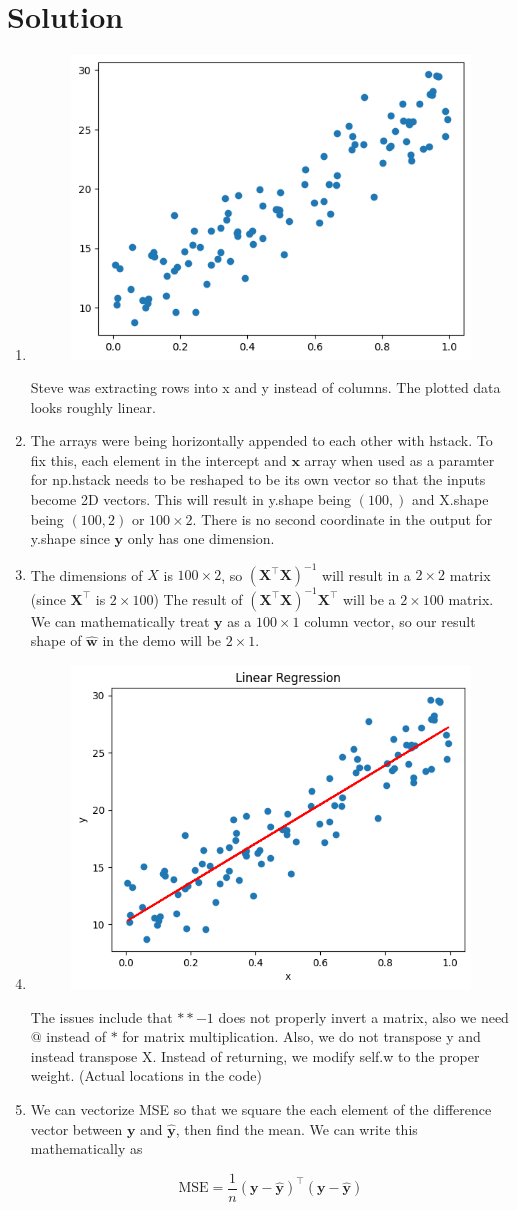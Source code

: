 \documentclass{../harvardml}
\theoremstyle{definition}
\theoremstyle{plain}
\newenvironment{solution}
  {\color{blue}\section*{Solution}}
{}
\begin{document}
\begin{solution}
	
    \begin{enumerate}
        \item 
        \begin{figure}[H]
            \centering
            \includegraphics[width=0.25\linewidth]{5a.png}
        \end{figure}
        Steve was extracting rows into x and y instead of columns. The plotted data looks roughly linear.
        \item The arrays were being horizontally appended to each other with hstack. To fix this, each element in the intercept and $\bm x$ array when used as a paramter for np.hstack needs to be reshaped to be its own vector so that the inputs become 2D vectors. This will result in y.shape being $(100, )$ and X.shape being $(100, 2)$ or $100 \times 2$. There is no second coordinate in the output for y.shape since $\bm y$ only has one dimension.
        \item The dimensions of $X$ is $100\times 2$, so $(\bm X^\top \bm X)^{-1}$ will result in a $2\times 2$ matrix (since $\bm X^\top$ is $2 \times 100$) The result of $(\bm X^\top \bm X)^{-1}\bm X^\top$ will be a $2\times 100$ matrix. We can mathematically treat $\bm y$ as a $100 \times 1$ column vector, so our result shape of $\bm{\hat w}$ in the demo will be $2 \times 1$.
    \item 
    \begin{figure}[H]
        \centering
        \includegraphics[width=0.25\linewidth]{5d.png}
    \end{figure}
    The issues include that $** -1$ does not properly invert a matrix, also we need $@$ instead of $*$ for matrix multiplication. Also, we do not transpose y and instead transpose X. Instead of returning, we modify self.w to the proper weight. (Actual locations in the code)
    \item We can vectorize MSE so that we square the each element of the difference vector between $\bm y$ and $\hat{\bm y}$, then find the mean. We can write this mathematically as

    \[
    \mathrm{MSE} = \frac{1}{n}(\bm y - \hat{\bm y})^\top (\bm y - \hat{\bm y})
    \]
        \end{enumerate}
\end{solution}
\end{document}
